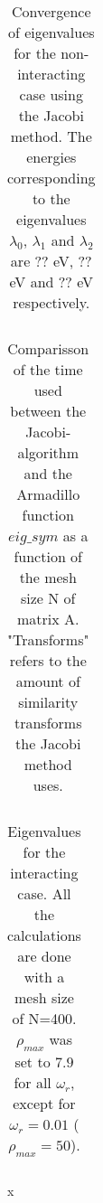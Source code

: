 
\begin{table}[H]\caption{Convergence of eigenvalues for the non-interacting case using the Jacobi method. The energies corresponding to the eigenvalues $\lambda_0$, $\lambda_1$ and $\lambda_2$ are ?? eV, ?? eV and ?? eV respectively.}
	\label{tab:eigval}
	\begin{tabular}{cccc}
		
	\end{tabular}
\end{table}


\begin{table}[H]\caption{Comparisson of the time used between the Jacobi-algorithm and the Armadillo function  $eig\_sym$ as a function of the mesh size N of matrix A. "Transforms" refers to the amount of similarity transforms the Jacobi method uses.}
	\label{tab:time}
	\begin{tabular}{cccccc}
		
	\end{tabular}
\end{table}

\begin{table}[H]\caption{Eigenvalues for the interacting case. All the calculations are done with a mesh size of N=400. $ \rho_{max} $ was set to $ 7.9 $ for all $ \omega_r $, except for $ \omega_r  = 0.01$ ( $ \rho_{max} =50$). }
	\label{tab:omega}
	\begin{tabular}{cccc}
		
	\end{tabular}
\end{table}x